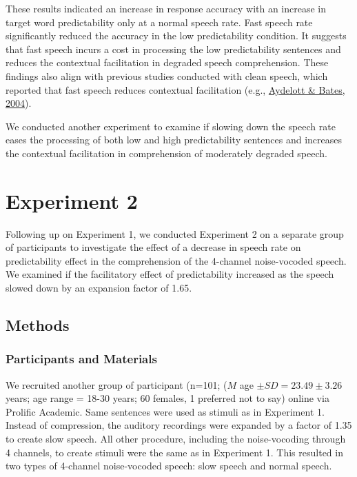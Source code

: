 \documentclass[a4paper, nobind]{templates/ociamthesis}
\begin{document}
These results indicated an increase in response accuracy with an increase in target word predictability only at a normal speech rate.
Fast speech rate significantly reduced the accuracy in the low predictability condition.
It suggests that fast speech incurs a cost in processing the low predictability sentences and reduces the contextual facilitation in degraded speech comprehension.
These findings also align with previous studies conducted with clean speech, which reported that fast speech reduces contextual facilitation (e.g., \protect\hyperlink{ref-Aydelott2004}{Aydelott \& Bates, 2004}).

We conducted another experiment to examine if slowing down the speech rate eases the processing of both low and high predictability sentences and increases the contextual facilitation in comprehension of moderately degraded speech.

\hypertarget{experiment-2}{%
\section{Experiment 2}\label{experiment-2}}

Following up on Experiment 1, we conducted Experiment 2 on a separate group of participants to investigate the effect of a decrease in speech rate on predictability effect in the comprehension of the 4-channel noise-vocoded speech.
We examined if the facilitatory effect of predictability increased as the speech slowed down by an expansion factor of 1.65.

\hypertarget{methods-4}{%
\subsection{Methods}\label{methods-4}}

\hypertarget{participants-and-materials-1}{%
\subsubsection{Participants and Materials}\label{participants-and-materials-1}}

We recruited another group of participant (n=101; (\(M\) age \(\pm SD=23.49\pm 3.26\) years; age range = 18-30 years; 60 females, 1 preferred not to say) online via Prolific Academic.
Same sentences were used as stimuli as in Experiment 1.
Instead of compression, the auditory recordings were expanded by a factor of 1.35 to create slow speech.
All other procedure, including the noise-vocoding through 4 channels, to create stimuli were the same as in Experiment 1.
This resulted in two types of 4-channel noise-vocoded speech: slow speech and normal speech.
\end{document}
